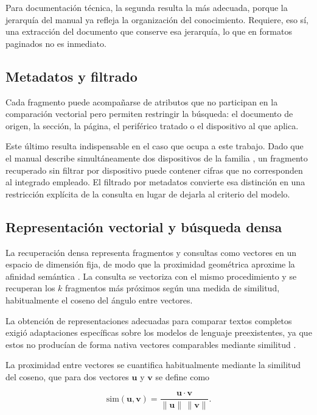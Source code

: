 Para documentación técnica, la segunda resulta la más adecuada, porque la
jerarquía del manual ya refleja la organización del conocimiento. Requiere, eso
sí, una extracción del documento que conserve esa jerarquía, lo que en formatos
paginados no es inmediato.

\subsection{Metadatos y filtrado}

Cada fragmento puede acompañarse de atributos que no participan en la
comparación vectorial pero permiten restringir la búsqueda: el documento de
origen, la sección, la página, el periférico tratado o el dispositivo al que
aplica.

Este último resulta indispensable en el caso que ocupa a este trabajo. Dado que
el manual describe simultáneamente dos dispositivos de la familia
\cite{microchip2024ds40002043}, un fragmento recuperado sin filtrar por
dispositivo puede contener cifras que no corresponden al integrado empleado. El
filtrado por metadatos convierte esa distinción en una restricción explícita de
la consulta en lugar de dejarla al criterio del modelo.

\subsection{Representación vectorial y búsqueda densa}

La recuperación densa representa fragmentos y consultas como vectores en un
espacio de dimensión fija, de modo que la proximidad geométrica aproxime la
afinidad semántica \cite{karpukhin2020dpr}. La consulta se vectoriza con el
mismo procedimiento y se recuperan los $k$ fragmentos más próximos según una
medida de similitud, habitualmente el coseno del ángulo entre vectores.

La obtención de representaciones adecuadas para comparar textos completos exigió
adaptaciones específicas sobre los modelos de lenguaje preexistentes, ya que
estos no producían de forma nativa vectores comparables mediante similitud
\cite{reimers2019sbert}.

La proximidad entre vectores se cuantifica habitualmente mediante la similitud
del coseno, que para dos vectores $\mathbf{u}$ y $\mathbf{v}$ se define como

\begin{equation}
  \mathrm{sim}(\mathbf{u},\mathbf{v}) =
    \frac{\mathbf{u} \cdot \mathbf{v}}
         {\lVert \mathbf{u} \rVert \, \lVert \mathbf{v} \rVert} .
  \label{eq:coseno}
\end{equation}

